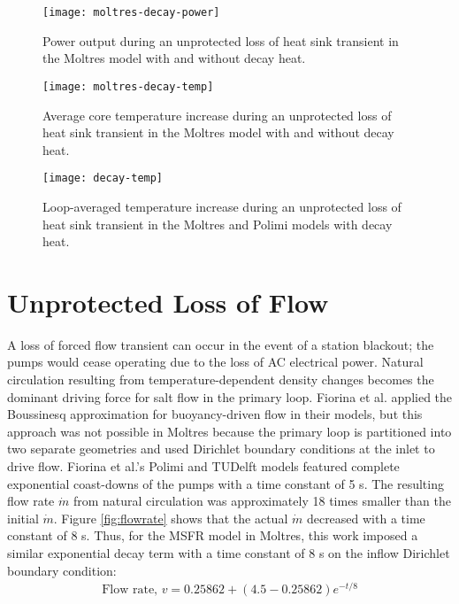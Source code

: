 \begin{figure}[htbp!]
    \centering
    \texttt{[image: moltres-decay-power]}
    \caption{Power output during
    an unprotected loss of heat sink transient in the Moltres model with and
    without decay heat.}
    \label{fig:moltresdecaypower}
    \texttt{[image: moltres-decay-temp]}
    \caption{Average core temperature increase during
    an unprotected loss of heat sink transient in the Moltres model with and
    without decay heat.}
    \label{fig:moltresdecaytemp}
\end{figure}

\clearpage

\begin{figure}[htbp!]
    \centering
    \texttt{[image: decay-temp]}
    \caption{Loop-averaged temperature increase during
    an unprotected loss of heat sink transient in the Moltres and Polimi
    models \cite{fiorina_modelling_2014} with decay heat.}
    \label{fig:polimidecaytemp}
\end{figure}

\section{Unprotected Loss of Flow}

A loss of forced flow transient can occur in the event of a station
blackout; the pumps would cease operating due to the loss of AC electrical
power. Natural circulation resulting from temperature-dependent density
changes becomes the dominant driving force for salt flow in the primary loop.
Fiorina et al. \cite{fiorina_modelling_2014} applied the Boussinesq
approximation for buoyancy-driven flow in their models, but this approach was
not possible in Moltres because the primary loop is partitioned into two
separate geometries and used Dirichlet boundary
conditions at the inlet to drive flow. Fiorina et al.'s Polimi and TUDelft
models featured complete exponential coast-downs of the pumps with a time
constant of 5 s. The resulting flow rate $\dot{m}$ from natural circulation
was approximately 18 times smaller than the initial $\dot{m}$. Figure
\ref{fig:flowrate} shows that the actual $\dot{m}$ decreased with a time
constant of 8 s. Thus, for the \gls{MSFR} model in Moltres, this work imposed
a similar exponential decay term with a time constant of 8 s on the inflow
Dirichlet boundary condition:
%
\begin{align}
    \text{Flow rate, } v = 0.25862 + (4.5-0.25862) e^{-t/8} 
    \label{eq:flowrate}
\end{align}

